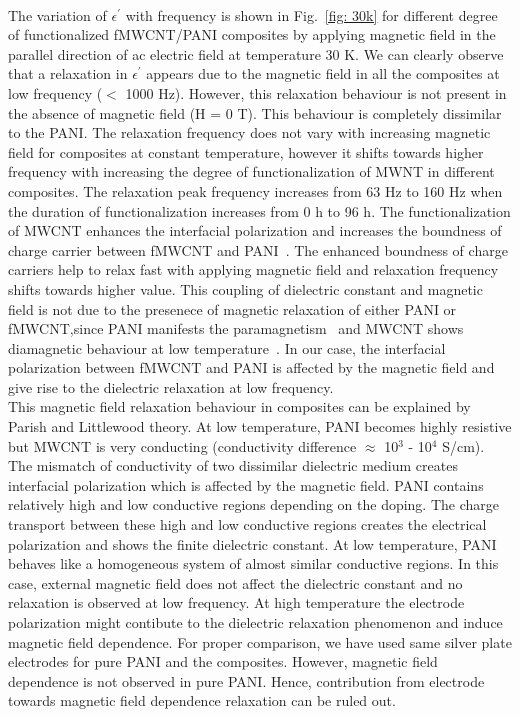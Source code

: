 \documentclass[journal=jaccck,manuscript=article]{achemso}
\begin{document}
\\ The variation of $\epsilon^\prime$ with frequency is shown in Fig.~\ref{fig: 30k} for different degree of functionalized fMWCNT/PANI composites by applying magnetic field in the parallel direction of ac electric field at temperature 30 K. We can clearly observe that a relaxation in $\epsilon^\prime$ appears due to the magnetic field in all the composites at low frequency ($<$ 1000 Hz). However, this relaxation behaviour is not present in the absence of magnetic field (H = 0 T). This behaviour is completely dissimilar to the PANI. The relaxation frequency does not vary with increasing magnetic field for composites at constant temperature, however it shifts towards higher frequency with increasing the degree of functionalization of MWNT in different composites. The relaxation peak frequency increases from 63 Hz to 160 Hz when the duration of functionalization increases from 0 h to 96 h. The functionalization of MWCNT enhances the interfacial polarization and increases the boundness of charge carrier between fMWCNT and PANI~\cite{10.1088/1361-6463/abd2eb}. The enhanced boundness of charge carriers help to relax fast with applying magnetic field and relaxation frequency shifts towards higher value. This coupling of dielectric constant and magnetic field is not due to the presenece of magnetic relaxation of either PANI or fMWCNT,since PANI manifests the paramagnetism~\cite{NOVAK20101725} and MWCNT shows diamagnetic behaviour at low temperature~\cite{ELLIS2006378}. In our case, the interfacial polarization between fMWCNT and PANI is affected by the magnetic field and give rise to the dielectric relaxation at low frequency.  
\\This magnetic field relaxation behaviour in composites can be explained by Parish and Littlewood theory. At low temperature, PANI becomes highly resistive but MWCNT is very conducting (conductivity difference $\approx$ 10$^3$ - 10$^4$ S/cm). The mismatch of conductivity of two dissimilar dielectric medium creates interfacial polarization which is affected by the magnetic field.  
PANI contains relatively high and low conductive regions depending on the doping. The charge transport between these high and low conductive regions creates the electrical polarization and shows the finite dielectric constant. At low temperature, PANI behaves like a homogeneous system of almost similar conductive regions. In this case, external magnetic field does not affect the dielectric constant and no relaxation is observed at low frequency.	 
At high temperature the  electrode polarization might contibute to the dielectric relaxation phenomenon and induce magnetic field dependence. For proper comparison, we have used same silver plate electrodes for pure PANI and the composites. However, magnetic field dependence is not observed in pure PANI. Hence, contribution from electrode towards magnetic field dependence relaxation can be ruled out.
\end{document}
